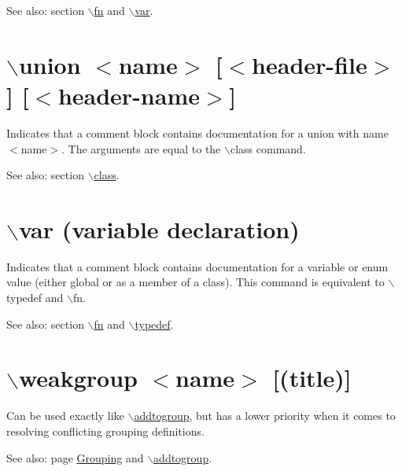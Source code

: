 \begin{Desc}
\item[See also:]section \hyperlink{commands_cmdfn}{$\backslash$fn} and \hyperlink{commands_cmdvar}{$\backslash$var}.\end{Desc}


 \hypertarget{commands_cmdunion}{}\section{$\backslash$union $<$name$>$ \mbox{[}$<$header-file$>$\mbox{]} \mbox{[}$<$header-name$>$\mbox{]}}\label{commands_cmdunion}
 Indicates that a comment block contains documentation for a union with name $<$name$>$. The arguments are equal to the $\backslash$class command.

\begin{Desc}
\item[See also:]section \hyperlink{commands_cmdclass}{$\backslash$class}.\end{Desc}


 \hypertarget{commands_cmdvar}{}\section{$\backslash$var (variable declaration)}\label{commands_cmdvar}
 Indicates that a comment block contains documentation for a variable or enum value (either global or as a member of a class). This command is equivalent to $\backslash$typedef and $\backslash$fn.

\begin{Desc}
\item[See also:]section \hyperlink{commands_cmdfn}{$\backslash$fn} and \hyperlink{commands_cmdtypedef}{$\backslash$typedef}.\end{Desc}


 \hypertarget{commands_cmdweakgroup}{}\section{$\backslash$weakgroup $<$name$>$ \mbox{[}(title)\mbox{]}}\label{commands_cmdweakgroup}
 Can be used exactly like \hyperlink{commands_cmdaddtogroup}{$\backslash$addtogroup}, but has a lower priority when it comes to resolving conflicting grouping definitions.

\begin{Desc}
\item[See also:]page \hyperlink{grouping}{Grouping} and \hyperlink{commands_cmdaddtogroup}{$\backslash$addtogroup}.\end{Desc}




